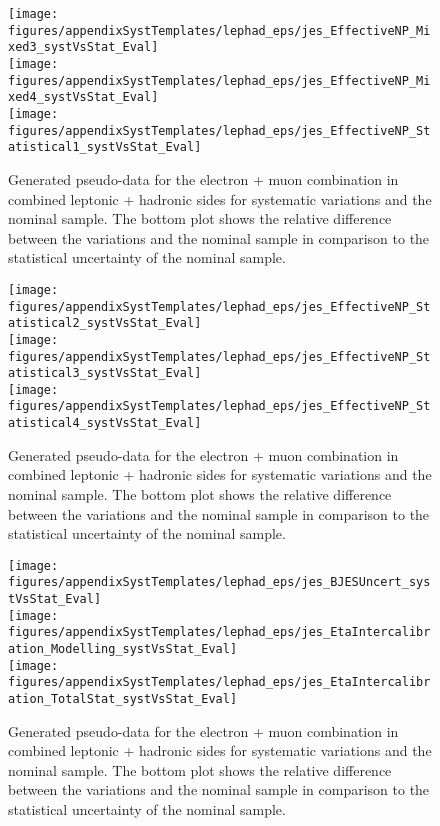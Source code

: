 \begin{figure}[!hb]
\begin{center}
        \texttt{[image: figures/appendixSystTemplates/lephad\_eps/jes\_EffectiveNP\_Mixed3\_systVsStat\_Eval]}\\
        \texttt{[image: figures/appendixSystTemplates/lephad\_eps/jes\_EffectiveNP\_Mixed4\_systVsStat\_Eval]}\\
        \texttt{[image: figures/appendixSystTemplates/lephad\_eps/jes\_EffectiveNP\_Statistical1\_systVsStat\_Eval]}\\
\caption{Generated pseudo-data for the electron + muon combination in combined leptonic + hadronic sides for systematic variations and the nominal \ttbar sample. The bottom plot shows the relative difference between the variations and the nominal sample in comparison to the statistical uncertainty of the nominal sample.}   
\label{fig:systematicVar_lephad_JES_3_1}
\end{center}
\end{figure}        
        
\begin{figure}[!hb]
\begin{center}
        \texttt{[image: figures/appendixSystTemplates/lephad\_eps/jes\_EffectiveNP\_Statistical2\_systVsStat\_Eval]}\\
        \texttt{[image: figures/appendixSystTemplates/lephad\_eps/jes\_EffectiveNP\_Statistical3\_systVsStat\_Eval]}\\
        \texttt{[image: figures/appendixSystTemplates/lephad\_eps/jes\_EffectiveNP\_Statistical4\_systVsStat\_Eval]}
\caption{Generated pseudo-data for the electron + muon combination in combined leptonic + hadronic sides for systematic variations and the nominal \ttbar sample. The bottom plot shows the relative difference between the variations and the nominal sample in comparison to the statistical uncertainty of the nominal sample.}   
\label{fig:systematicVar_lephad_JES_3_2}
\end{center}
\end{figure}        
\begin{figure}[!hb]
\begin{center}
        \texttt{[image: figures/appendixSystTemplates/lephad\_eps/jes\_BJESUncert\_systVsStat\_Eval]}\\
        \texttt{[image: figures/appendixSystTemplates/lephad\_eps/jes\_EtaIntercalibration\_Modelling\_systVsStat\_Eval]}\\
        \texttt{[image: figures/appendixSystTemplates/lephad\_eps/jes\_EtaIntercalibration\_TotalStat\_systVsStat\_Eval]}
\caption{Generated pseudo-data for the electron + muon combination in combined leptonic + hadronic sides for systematic variations and the nominal \ttbar sample. The bottom plot shows the relative difference between the variations and the nominal sample in comparison to the statistical uncertainty of the nominal sample.}   
\label{fig:systematicVar_lephad_JES_4_1}
\end{center}
\end{figure}

